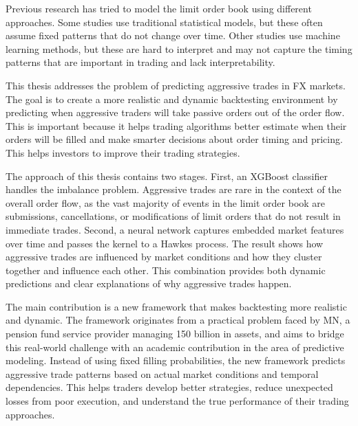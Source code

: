 Previous research has tried to model the limit order book using different approaches. Some studies use traditional statistical models, but these often assume fixed patterns that do not change over time. Other studies use machine learning methods, but these are hard to interpret and may not capture the timing patterns that are important in trading and lack interpretability. 

This thesis addresses the problem of predicting aggressive trades in FX markets. The goal is to create a more realistic and dynamic backtesting environment by predicting when aggressive traders will take passive orders out of the order flow. This is important because it helps trading algorithms better estimate when their orders will be filled and make smarter decisions about order timing and pricing. This helps investors to improve their trading strategies.

The approach of this thesis contains two stages. First, an XGBoost classifier handles the imbalance problem. Aggressive trades are rare in the context of the overall order flow, as the vast majority of events in the limit order book are submissions, cancellations, or modifications of limit orders that do not result in immediate trades. Second, a neural network captures embedded market features over time and passes the kernel to a Hawkes process. The result shows how aggressive trades are influenced by market conditions and how they cluster together and influence each other. This combination provides both dynamic predictions and clear explanations of why aggressive trades happen.

The main contribution is a new framework that makes backtesting more realistic and dynamic. The framework originates from a practical problem faced by MN, a pension fund service provider managing \texteuro{}150 billion in assets, and aims to bridge this real-world challenge with an academic contribution in the area of predictive modeling. Instead of using fixed filling probabilities, the new framework predicts aggressive trade patterns based on actual market conditions and temporal dependencies. This helps traders develop better strategies, reduce unexpected losses from poor execution, and understand the true performance of their trading approaches. 

